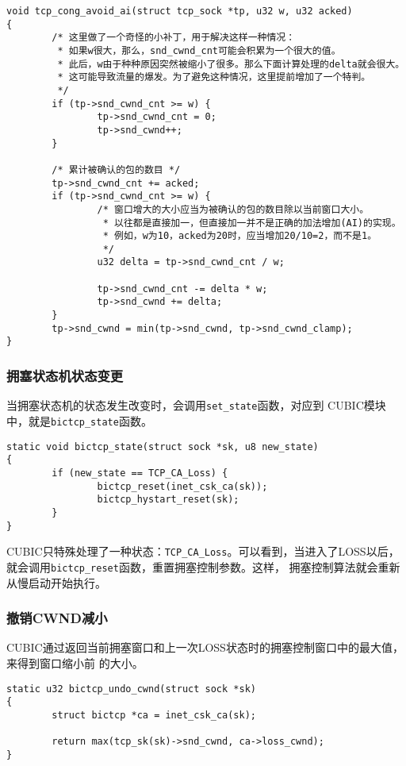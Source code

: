 \begin{verbatim}
void tcp_cong_avoid_ai(struct tcp_sock *tp, u32 w, u32 acked)
{
        /* 这里做了一个奇怪的小补丁，用于解决这样一种情况：
         * 如果w很大，那么，snd_cwnd_cnt可能会积累为一个很大的值。
         * 此后，w由于种种原因突然被缩小了很多。那么下面计算处理的delta就会很大。
         * 这可能导致流量的爆发。为了避免这种情况，这里提前增加了一个特判。
         */
        if (tp->snd_cwnd_cnt >= w) {
                tp->snd_cwnd_cnt = 0;
                tp->snd_cwnd++;
        }

        /* 累计被确认的包的数目 */
        tp->snd_cwnd_cnt += acked;
        if (tp->snd_cwnd_cnt >= w) {
                /* 窗口增大的大小应当为被确认的包的数目除以当前窗口大小。
                 * 以往都是直接加一，但直接加一并不是正确的加法增加(AI)的实现。
                 * 例如，w为10，acked为20时，应当增加20/10=2，而不是1。
                 */
                u32 delta = tp->snd_cwnd_cnt / w;

                tp->snd_cwnd_cnt -= delta * w;
                tp->snd_cwnd += delta;
        }
        tp->snd_cwnd = min(tp->snd_cwnd, tp->snd_cwnd_clamp);
}
\end{verbatim}

\subsubsection{拥塞状态机状态变更}
当拥塞状态机的状态发生改变时，会调用\texttt{set_state}函数，对应到
CUBIC模块中，就是\texttt{bictcp_state}函数。

\begin{verbatim}
static void bictcp_state(struct sock *sk, u8 new_state)
{
        if (new_state == TCP_CA_Loss) {
                bictcp_reset(inet_csk_ca(sk));
                bictcp_hystart_reset(sk);
        }
}
\end{verbatim}
CUBIC只特殊处理了一种状态：\texttt{TCP_CA_Loss}。可以看到，当进入了LOSS以后，
就会调用\texttt{bictcp_reset}函数，重置拥塞控制参数。这样，
拥塞控制算法就会重新从慢启动开始执行。

\subsubsection{撤销CWND减小}
CUBIC通过返回当前拥塞窗口和上一次LOSS状态时的拥塞控制窗口中的最大值，来得到窗口缩小前
的大小。
\begin{verbatim}
static u32 bictcp_undo_cwnd(struct sock *sk)
{
        struct bictcp *ca = inet_csk_ca(sk);

        return max(tcp_sk(sk)->snd_cwnd, ca->loss_cwnd);
}
\end{verbatim}

